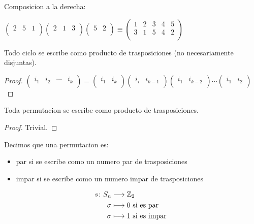 \begin{example}
	Composicion a la derecha:
	
	\(\begin{pmatrix}
		2 & 5 & 1 \\
	\end{pmatrix}\begin{pmatrix}
		2 & 1 & 3 \\
	\end{pmatrix} \begin{pmatrix}
		5 & 2 \\
	\end{pmatrix} \equiv \begin{pmatrix}
		1 & 2 & 3 & 4 & 5 \\
		3 & 1 & 5 & 4 & 2 \\
	\end{pmatrix}\)
\end{example}
\begin{lemma}
	Todo ciclo se escribe como producto de trasposiciones (no necesariamente disjuntas).
\end{lemma}
\begin{proof}
	\(\begin{pmatrix}
		i_1 & i_2 & \cdots & i_k \\
	\end{pmatrix} = \begin{pmatrix}
		i_1 & i_k \\
	\end{pmatrix} \begin{pmatrix}
		i_i & i_{k-1} \\
	\end{pmatrix}\begin{pmatrix}
		i_1 & i_{k-2} \\
	\end{pmatrix} \cdots \begin{pmatrix}
		i_1 & i_2 \\
	\end{pmatrix}\)
\end{proof}
\begin{corollary}
	Toda permutacion se escribe como producto de trasposiciones.
\end{corollary}
\begin{proof}
	Trivial.
\end{proof}
\begin{definition}
	Decimos que una permutacion es:
	\begin{itemize}
		\item par si se escribe como un numero par de trasposiciones
		\item impar si se escribe como un numero impar de trasposiciones
	\end{itemize}
	\[
		\begin{aligned}
			s \colon S_n & \longrightarrow \mathbb{Z}_2               \\
			\sigma       & \longmapsto 0 \text{ si es par }   \\
			\sigma       & \longmapsto 1 \text{ si es impar }
		\end{aligned}
	\]
\end{definition}
